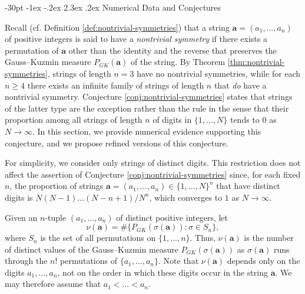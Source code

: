 \documentclass[10pt]{article}
\makeatletter
\renewcommand\section{\@startsection {section}{1}{\z@}
{-30pt \@plus -1ex \@minus -.2ex}
{2.3ex \@plus.2ex}
{\normalfont\normalsize\bfseries\boldmath}}
\theoremstyle{definition}
\numberwithin{equation}{section}
\numberwithin{lemma}{section}
\newcommand{\bfa}{\mathbf{a}}
\makeatother
\begin{document}
\section{Numerical Data and Conjectures}
\label{sec:numerical-data}



Recall (cf. Definition \ref{def:nontrivial-symmetries}) that a string
$\bfa=(a_1,\dots,a_n)$ of positive integers is said to have a \emph{nontrivial
symmetry} if there exists a permutation of $\bfa$ other than the identity
and the reverse that preserves the Gauss--Kuzmin measure $P_{GK}(\bfa)$
of the string.  By Theorem \ref{thm:nontrivial-symmetries}, strings of
length $n=3$ have no nontrivial symmetries,  while for each $n\ge 4$
there exists an infinite family of strings of length $n$ that \emph{do}
have a nontrivial symmetry.  Conjecture \ref{conj:nontrivial-symmetries}
states that strings of the latter type are the exception rather than the
rule in the sense that their proportion among all strings of length $n$
of digits in $\{1,\dots,N\}$ tends to $0$ as $N\to\infty$.  In this
section, we provide numerical evidence supporting this conjecture, and
we propose refined versions of this conjecture.


For simplicity, we consider only strings of distinct
digits. This restriction does not affect the assertion of
Conjecture \ref{conj:nontrivial-symmetries} since, for each fixed $n$,
the proportion of strings $\bfa=(a_1,\dots,a_n)\in\{1,\dots,N\}^n$ that
have distinct digits is $N(N-1)\dots(N-n+1)/N^n$, which converges to $1$ 
as $N\to\infty$. 

Given an $n$-tuple $(a_1,\dots,a_n)$ 
of distinct positive integers, let 
\begin{equation}
\label{eq:nubfa-def}
\nu(\bfa)=\#\{P_{GK}(\sigma(\bfa)): \sigma\in S_n \},
\end{equation}
where $S_n$ is the set of all permutations on $\{1,\dots,n\}$.
Thus, $\nu(\bfa)$ is the number of distinct values of the Gauss--Kuzmin 
measure $P_{GK}(\sigma(\bfa))$ as $\sigma(\bfa)$ runs through the $n!$
permutations of $\{a_1,\dots,a_n\}$.   Note that $\nu(\bfa)$
depends only on the digits $a_1,\dots,a_n$, not on the order in which
these digits occur in the string $\bfa$.  We may therefore assume that
$a_1<\dots<a_n$.
\end{document}

